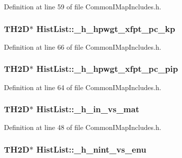 Definition at line 59 of file Common\-I\-Map\-Includes.\-h.

\hypertarget{struct_hist_list_a534409c384da12897ac101a95852e54c}{
\subsubsection[{\-\_\-h\-\_\-hpwgt\-\_\-xfpt\-\_\-pc\-\_\-kp}]{\setlength{\rightskip}{0pt plus 5cm}T\-H2\-D$\ast$ Hist\-List\-::\-\_\-h\-\_\-hpwgt\-\_\-xfpt\-\_\-pc\-\_\-kp}}\label{struct_hist_list_a534409c384da12897ac101a95852e54c}


Definition at line 66 of file Common\-I\-Map\-Includes.\-h.

\hypertarget{struct_hist_list_aafe90f38cae3e57f9f789e7af2c240a3}{
\subsubsection[{\-\_\-h\-\_\-hpwgt\-\_\-xfpt\-\_\-pc\-\_\-pip}]{\setlength{\rightskip}{0pt plus 5cm}T\-H2\-D$\ast$ Hist\-List\-::\-\_\-h\-\_\-hpwgt\-\_\-xfpt\-\_\-pc\-\_\-pip}}\label{struct_hist_list_aafe90f38cae3e57f9f789e7af2c240a3}


Definition at line 64 of file Common\-I\-Map\-Includes.\-h.

\hypertarget{struct_hist_list_a99d4e0ee524da7ff7d12990b3159517a}{
\subsubsection[{\-\_\-h\-\_\-in\-\_\-vs\-\_\-mat}]{\setlength{\rightskip}{0pt plus 5cm}T\-H2\-D$\ast$ Hist\-List\-::\-\_\-h\-\_\-in\-\_\-vs\-\_\-mat}}\label{struct_hist_list_a99d4e0ee524da7ff7d12990b3159517a}


Definition at line 48 of file Common\-I\-Map\-Includes.\-h.

\hypertarget{struct_hist_list_a8797ee3ee7591db8ab074eceec908417}{
\subsubsection[{\-\_\-h\-\_\-nint\-\_\-vs\-\_\-enu}]{\setlength{\rightskip}{0pt plus 5cm}T\-H2\-D$\ast$ Hist\-List\-::\-\_\-h\-\_\-nint\-\_\-vs\-\_\-enu}}\label{struct_hist_list_a8797ee3ee7591db8ab074eceec908417}


